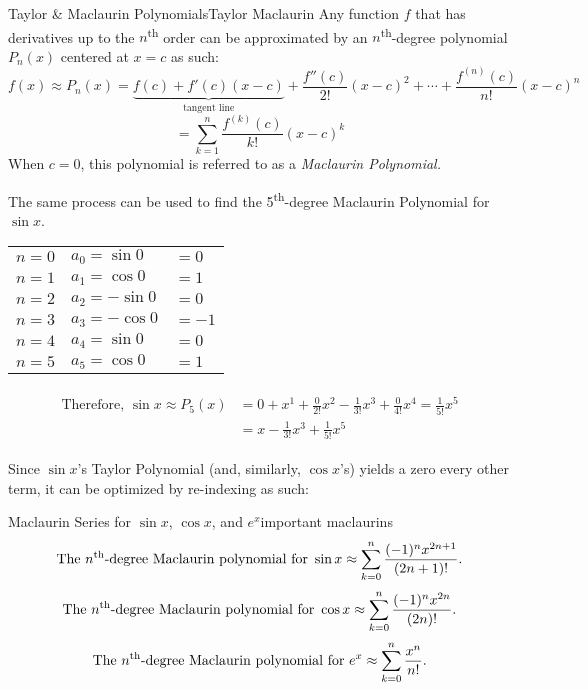 \documentclass[10pt]{article}
\theoremstyle{definition}
\begin{document}
\begin{theorem}{Taylor \& Maclaurin Polynomials}{Taylor Maclaurin}
    Any function $f$ that has derivatives up to the $n$\textsuperscript{th} order can be approximated by an $n$\textsuperscript{th}-degree polynomial $P_n(x)$ centered at $x=c$ as such:
    \[f(x) \approx P_n(x)= \underbrace{f(c)+f'(c)(x-c)}_{\text{tangent line}}+\frac{f''(c)}{2!}(x-c)^2 + \cdots + \frac{f^{(n)}(c)}{n!}(x-c)^n\]
    \[= \sum_{k=1}^{n} \frac{f^{(k)}(c)}{k!}(x-c)^k\]
    When $c=0$, this polynomial is referred to as a \textit{Maclaurin Polynomial.}
\end{theorem}

The same process can be used to find the 5\textsuperscript{th}-degree Maclaurin Polynomial for $\sin x$.

\begin{center}
\begin{tabular}{l l l}
$n=0$    &$a_0=\sin 0$ & $= 0$ \\
$n=1$    &$a_1=\cos 0$ & $=1$ \\
$n=2$    &$a_2=-\sin 0$ & $= 0$ \\
$n=3$    &$a_3=-\cos 0$ & $= -1$ \\
$n=4$    &$a_4=\sin 0$ & $= 0$ \\
$n=5$    &$a_5=\cos 0$ & $= 1$ \\
\end{tabular}
\end{center}

\begin{align*}
\begin{split}
    \text{Therefore, } \sin x \approx P_5(x)&=0+x^1+\frac{0}{2!}x^2 - \frac{1}{3!}x^3 + \frac{0}{4!}x^4  = \frac{1}{5!}x^5\\
    &= x- \frac{1}{3!}x^3 + \frac{1}{5!}x^5
\end{split}
\end{align*}

Since $\sin x $'s Taylor Polynomial (and, similarly, $\cos x$'s) yields a zero every other term, it can be optimized by re-indexing as such:

\begin{theorem}{Maclaurin Series for $\sin x$, $\cos x$, and $e^x$}{important maclaurins}
\vspace{-.3cm}
    \[\text{The $n$\textsuperscript{th}-degree Maclaurin polynomial for }\sin x \approx \sum_{k=0}^{n} \frac{(-1)^nx^{2n+1}}{(2n+1)!}.\]
\vspace{-.3cm}
    \[\text{The $n$\textsuperscript{th}-degree Maclaurin polynomial for }\cos x \approx \sum_{k=0}^{n} \frac{(-1)^nx^{2n}}{(2n)!}.\]
\vspace{-.3cm}
    \[\text{The $n$\textsuperscript{th}-degree Maclaurin polynomial for }e^x \approx \sum_{k=0}^{n} \frac{x^n}{n!}.\]
\end{theorem}
\end{document}
